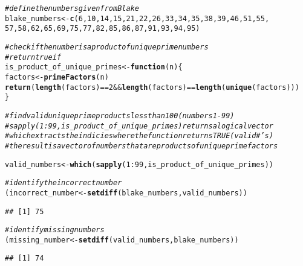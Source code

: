 \documentclass{article}\usepackage[]{graphicx}\usepackage[]{xcolor}
\makeatletter
\newcommand{\hlnum}[1]{\textcolor[rgb]{0.686,0.059,0.569}{#1}}%
\newcommand{\hlcom}[1]{\textcolor[rgb]{0.678,0.584,0.686}{\textit{#1}}}%
\newcommand{\hlopt}[1]{\textcolor[rgb]{0,0,0}{#1}}%
\newcommand{\hldef}[1]{\textcolor[rgb]{0.345,0.345,0.345}{#1}}%
\newcommand{\hlkwa}[1]{\textcolor[rgb]{0.161,0.373,0.58}{\textbf{#1}}}%
\newcommand{\hlkwb}[1]{\textcolor[rgb]{0.69,0.353,0.396}{#1}}%
\newcommand{\hlkwc}[1]{\textcolor[rgb]{0.333,0.667,0.333}{#1}}%
\newcommand{\hlkwd}[1]{\textcolor[rgb]{0.737,0.353,0.396}{\textbf{#1}}}%
\newenvironment{kframe}{%
 \def\at@end@of@kframe{}%
 \ifinner\ifhmode%
  \def\at@end@of@kframe{\end{minipage}}%
  \begin{minipage}{\columnwidth}%
 \fi\fi%
 \def\FrameCommand##1{\hskip\@totalleftmargin \hskip-\fboxsep
 \colorbox{shadecolor}{##1}\hskip-\fboxsep
     \hskip-\linewidth \hskip-\@totalleftmargin \hskip\columnwidth}%
 \MakeFramed {\advance\hsize-\width
   \@totalleftmargin\z@ \linewidth\hsize
   \@setminipage}}%
 {\par\unskip\endMakeFramed%
 \at@end@of@kframe}
\newenvironment{knitrout}{}{} %
\makeatother
\begin{document}
\begin{enumerate}
\begin{knitrout}
\begin{kframe}
\begin{alltt}
\hlcom{# define the numbers given from Blake}
\hldef{blake_numbers} \hlkwb{<-} \hlkwd{c}\hldef{(}\hlnum{6}\hldef{,} \hlnum{10}\hldef{,} \hlnum{14}\hldef{,} \hlnum{15}\hldef{,} \hlnum{21}\hldef{,} \hlnum{22}\hldef{,} \hlnum{26}\hldef{,} \hlnum{33}\hldef{,} \hlnum{34}\hldef{,} \hlnum{35}\hldef{,} \hlnum{38}\hldef{,} \hlnum{39}\hldef{,} \hlnum{46}\hldef{,} \hlnum{51}\hldef{,} \hlnum{55}\hldef{,}
                   \hlnum{57}\hldef{,} \hlnum{58}\hldef{,} \hlnum{62}\hldef{,} \hlnum{65}\hldef{,} \hlnum{69}\hldef{,} \hlnum{75}\hldef{,} \hlnum{77}\hldef{,} \hlnum{82}\hldef{,} \hlnum{85}\hldef{,} \hlnum{86}\hldef{,} \hlnum{87}\hldef{,} \hlnum{91}\hldef{,} \hlnum{93}\hldef{,} \hlnum{94}\hldef{,} \hlnum{95}\hldef{)}

\hlcom{# check if the number is a product of unique prime numbers}
\hlcom{# return true if }
\hldef{is_product_of_unique_primes} \hlkwb{<-} \hlkwa{function}\hldef{(}\hlkwc{n}\hldef{) \{}
  \hldef{factors} \hlkwb{<-} \hlkwd{primeFactors}\hldef{(n)}
  \hlkwd{return}\hldef{(}\hlkwd{length}\hldef{(factors)} \hlopt{==} \hlnum{2} \hlopt{&&} \hlkwd{length}\hldef{(factors)} \hlopt{==} \hlkwd{length}\hldef{(}\hlkwd{unique}\hldef{(factors)))}
\hldef{\}}

\hlcom{# find valid unique prime products less than 100 (numbers 1-99)}
\hlcom{# sapply(1:99, is_product_of_unique_primes) returns a logical vector}
\hlcom{# which extracts the indicies where the function returns TRUE (valid #'s)}
\hlcom{# the result is a vector of numbers that are products of unique prime factors}

\hldef{valid_numbers} \hlkwb{<-} \hlkwd{which}\hldef{(}\hlkwd{sapply}\hldef{(}\hlnum{1}\hlopt{:}\hlnum{99}\hldef{, is_product_of_unique_primes))}

\hlcom{# identify the incorrect number}
\hldef{(incorrect_number} \hlkwb{<-} \hlkwd{setdiff}\hldef{(blake_numbers,valid_numbers))}
\end{alltt}
\begin{verbatim}
## [1] 75
\end{verbatim}
\begin{alltt}
\hlcom{# identify missing numbers}
\hldef{(missing_number} \hlkwb{<-} \hlkwd{setdiff}\hldef{(valid_numbers, blake_numbers))}
\end{alltt}
\begin{verbatim}
## [1] 74
\end{verbatim}
\end{kframe}
\end{knitrout}
\end{enumerate}
\end{document}
